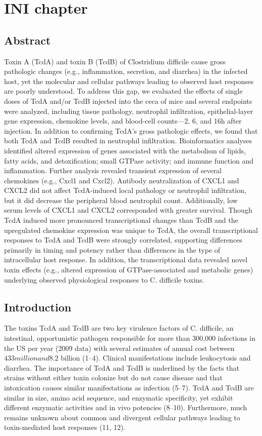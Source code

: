 \chapter{ INI chapter }

\section{Abstract}

Toxin A (TcdA) and toxin B (TcdB) of Clostridium difficile cause gross pathologic changes (e.g., inflammation, secretion, and diarrhea) in the infected host, yet the molecular and cellular pathways leading to observed host responses are poorly understood. To address this gap, we evaluated the effects of single doses of TcdA and/or TcdB injected into the ceca of mice and several endpoints were analyzed, including tissue pathology, neutrophil infiltration, epithelial-layer gene expression, chemokine levels, and blood-cell counts—2, 6, and 16h after injection. In addition to confirming TcdA’s gross pathologic effects, we found that both TcdA and TcdB resulted in neutrophil infiltration. Bioinformatics analyses identified altered expression of genes associated with the metabolism of lipids, fatty acids, and detoxification; small GTPase activity; and immune function and inflammation. Further analysis revealed transient expression of several chemokines (e.g., Cxcl1 and Cxcl2). Antibody neutralization of CXCL1 and CXCL2 did not affect TcdA-induced local pathology or neutrophil infiltration, but it did decrease the peripheral blood neutrophil count. Additionally, low serum levels of CXCL1 and CXCL2 corresponded with greater survival. Though TcdA induced more pronounced transcriptional changes than TcdB and the upregulated chemokine expression was unique to TcdA, the overall transcriptional responses to TcdA and TcdB were strongly correlated, supporting differences primarily in timing and potency rather than differences in the type of intracellular host response. In addition, the transcriptional data revealed novel toxin effects (e.g., altered expression of GTPase-associated and metabolic genes) underlying observed physiological responses to C. difficile toxins.

\section{Introduction}

The toxins TcdA and TcdB are two key virulence factors of C. difficile, an intestinal, opportunistic pathogen responsible for more than 300,000 infections in the US per year (2009 data) with several estimates of annual cost between $433 million and $8.2 billion (1–4). Clinical manifestations include leukocytosis and diarrhea. The importance of TcdA and TcdB is underlined by the facts that strains without either toxin colonize but do not cause disease and that intoxication causes similar manifestations as infection (5–7). TcdA and TcdB are similar in size, amino acid sequence, and enzymatic specificity, yet exhibit different enzymatic activities and in vivo potencies (8–10). Furthermore, much remains unknown about common and divergent cellular pathways leading to toxin-mediated host responses (11, 12).

